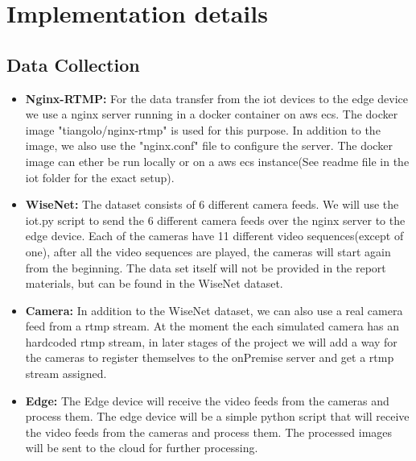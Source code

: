 \documentclass[conference]{IEEEtran}
\begin{document}
\section{Implementation details}
\subsection{Data Collection}
\begin{itemize}
    \item \textbf{Nginx-RTMP:} For the data transfer from the iot devices to the edge device we use a nginx server running in a docker container on aws ecs.
          The docker image "tiangolo/nginx-rtmp" is used for this purpose. In addition to the image, we also use the "nginx.conf" file to configure the server.
          The docker image can ether be run locally or on a aws ecs instance(See readme file in the iot folder for the exact setup).
    \item \textbf{WiseNet:} The dataset consists of 6 different camera feeds. We will use the iot.py script to send the 6 different camera feeds over the nginx server to the edge device.
          Each of the cameras have 11 different video sequences(except of one), after all the video sequences are played, the cameras will start again from the beginning.
          The data set itself will not be provided in the report materials, but can be found in the WiseNet dataset.
    \item \textbf{Camera:} In addition to the WiseNet dataset, we can also use a real camera feed from a rtmp stream. At the moment the each simulated camera has an hardcoded rtmp stream, in later
          stages of the project we will add a way for the cameras to register themselves to the onPremise server and get a rtmp stream assigned.
    \item \textbf{Edge:} The Edge device will receive the video feeds from the cameras and process them. The edge device will be a simple python script that will receive the video feeds from the cameras
          and process them. The processed images will be sent to the cloud for further processing.
\end{itemize}
\end{document}
